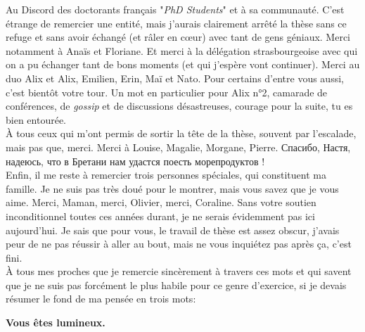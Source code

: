 Au Discord des doctorants français "\textit{PhD Students}" et à sa communauté. C'est étrange de remercier une entité, mais j'aurais clairement arrêté la thèse sans ce refuge et sans avoir échangé (et râler en cœur) avec tant de gens géniaux. Merci notamment à Anaïs et Floriane. Et merci à la délégation strasbourgeoise avec qui on a pu échanger tant de bons moments (et qui j'espère vont continuer). Merci au duo Alix et Alix, Emilien, Erin, Maï et Nato. Pour certains d'entre vous aussi, c'est bientôt votre tour. Un mot en particulier pour Alix n°2, camarade de conférences, de \textit{gossip} et de discussions désastreuses, courage pour la suite, tu es bien entourée. \\

À tous ceux qui m'ont permis de sortir la tête de la thèse, souvent par l'escalade, mais pas que, merci. Merci à Louise, Magalie, Morgane, Pierre. \selectfont Спасибо, Настя, надеюсь, что в Бретани нам удастся поесть морепродуктов !\selectfont \\

Enfin, il me reste à remercier trois personnes spéciales, qui constituent ma famille. Je ne suis pas très doué pour le montrer, mais vous savez que je vous aime. Merci, Maman, merci, Olivier, merci, Coraline. Sans votre soutien inconditionnel toutes ces années durant, je ne serais évidemment pas ici aujourd'hui. Je sais que pour vous, le travail de thèse est assez obscur, j'avais peur de ne pas réussir à aller au bout, mais ne vous inquiétez pas après ça, c'est fini. \\

À tous mes proches que je remercie sincèrement à travers ces mots et qui savent que je ne suis pas forcément le plus habile pour ce genre d'exercice, si je devais résumer le fond de ma pensée en trois mots: \\
\begin{center}
\Large \textbf{Vous êtes lumineux.}
\end{center}

